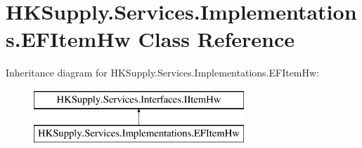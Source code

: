 \hypertarget{class_h_k_supply_1_1_services_1_1_implementations_1_1_e_f_item_hw}{}\section{H\+K\+Supply.\+Services.\+Implementations.\+E\+F\+Item\+Hw Class Reference}
\label{class_h_k_supply_1_1_services_1_1_implementations_1_1_e_f_item_hw}
Inheritance diagram for H\+K\+Supply.\+Services.\+Implementations.\+E\+F\+Item\+Hw\+:\begin{figure}[H]
\begin{center}
\leavevmode
\includegraphics[height=2.000000cm]{class_h_k_supply_1_1_services_1_1_implementations_1_1_e_f_item_hw}
\end{center}
\end{figure}
